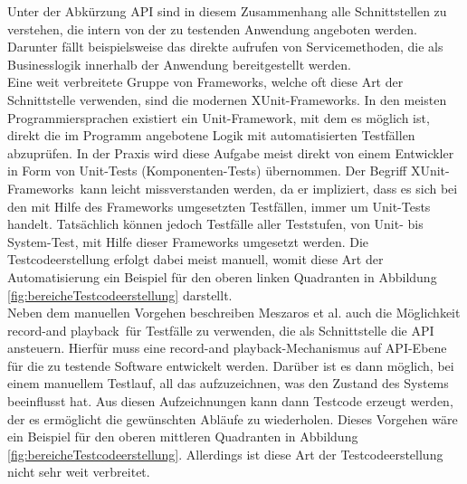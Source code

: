 Unter der Abkürzung API sind in diesem Zusammenhang alle Schnittstellen zu verstehen, die intern von der zu testenden Anwendung angeboten werden. Darunter fällt beispielsweise das direkte aufrufen von Servicemethoden, die als Businesslogik innerhalb der Anwendung bereitgestellt werden.\\
Eine weit verbreitete Gruppe von Frameworks, welche oft diese Art der Schnittstelle verwenden, sind die modernen \grq XUnit-Frameworks\grq. In den meisten Programmiersprachen existiert ein Unit-Framework, mit dem es möglich ist, direkt die im Programm angebotene Logik mit automatisierten Testfällen abzuprüfen. In der Praxis wird diese Aufgabe meist direkt von einem Entwickler in Form von Unit-Tests (Komponenten-Tests) übernommen. Der Begriff \grq XUnit-Frameworks\grq\ kann leicht missverstanden werden, da er impliziert, dass es sich bei den mit Hilfe des Frameworks umgesetzten Testfällen, immer um Unit-Tests handelt. Tatsächlich können jedoch Testfälle aller Teststufen, von Unit- bis System-Test, mit Hilfe dieser Frameworks umgesetzt werden.
Die Testcodeerstellung erfolgt dabei meist manuell, womit diese Art der Automatisierung ein Beispiel für den oberen linken Quadranten in Abbildung \ref{fig:bereicheTestcodeerstellung} darstellt.\\
Neben dem manuellen Vorgehen beschreiben Meszaros et al. \cite{meszaros_agile_2003} auch die Möglichkeit \grq record-and playback\grq\ für Testfälle zu verwenden, die als Schnittstelle die API ansteuern.
Hierfür muss eine \grq record-and playback\grq-Mechanismus auf API-Ebene für die zu testende Software entwickelt werden. Darüber ist es dann möglich, bei einem manuellem Testlauf, all das aufzuzeichnen, was den Zustand des Systems beeinflusst hat. Aus diesen Aufzeichnungen kann dann Testcode erzeugt werden, der es ermöglicht die gewünschten Abläufe zu wiederholen. Dieses Vorgehen wäre ein Beispiel für den oberen mittleren Quadranten in Abbildung \ref{fig:bereicheTestcodeerstellung}. Allerdings ist diese Art der Testcodeerstellung nicht sehr weit verbreitet.

